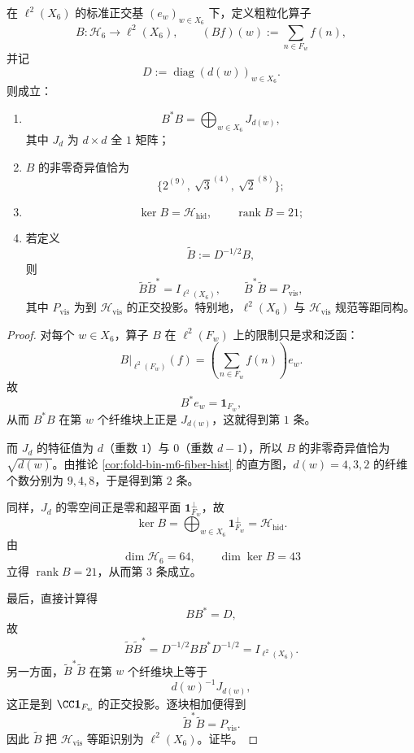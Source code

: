 \begin{theorem}[粗粒化算子的三值奇异谱]\label{thm:xi-time-part55d-window6-coarse-graining-three-singular-values}
在 \(\ell^2(X_6)\) 的标准正交基 \((e_w)_{w\in X_6}\) 下，定义粗粒化算子
\[
B:\mathcal H_6\longrightarrow \ell^2(X_6),
\qquad
(Bf)(w):=\sum_{n\in F_w}f(n),
\]
并记
\[
D:=\operatorname{diag}(d(w))_{w\in X_6}.
\]
则成立：
\begin{enumerate}
  \item
  \[
  B^*B=\bigoplus_{w\in X_6}J_{d(w)},
  \]
  其中 \(J_d\) 为 \(d\times d\) 全 \(1\) 矩阵；
  \item \(B\) 的非零奇异值恰为
  \[
  \{2^{(9)},\ \sqrt3^{(4)},\ \sqrt2^{(8)}\};
  \]
  \item
  \[
  \ker B=\mathcal H_{\mathrm{hid}},
  \qquad
  \operatorname{rank}B=21;
  \]
  \item 若定义
  \[
  \widetilde B:=D^{-1/2}B,
  \]
  则
  \[
  \widetilde B\widetilde B^*=I_{\ell^2(X_6)},
  \qquad
  \widetilde B^*\widetilde B=P_{\mathrm{vis}},
  \]
  其中 \(P_{\mathrm{vis}}\) 为到 \(\mathcal H_{\mathrm{vis}}\) 的正交投影。特别地，\(\ell^2(X_6)\) 与 \(\mathcal H_{\mathrm{vis}}\) 规范等距同构。
\end{enumerate}
\end{theorem}
\begin{proof}
对每个 \(w\in X_6\)，算子 \(B\) 在 \(\ell^2(F_w)\) 上的限制只是求和泛函：
\[
B|_{\ell^2(F_w)}(f)
=
\left(\sum_{n\in F_w}f(n)\right)e_w.
\]
故
\[
B^*e_w=\mathbf 1_{F_w},
\]
从而 \(B^*B\) 在第 \(w\) 个纤维块上正是 \(J_{d(w)}\)，这就得到第 \(1\) 条。

而 \(J_d\) 的特征值为 \(d\)（重数 \(1\)）与 \(0\)（重数 \(d-1\)），所以 \(B\) 的非零奇异值恰为 \(\sqrt{d(w)}\)。由推论 \ref{cor:fold-bin-m6-fiber-hist} 的直方图，\(d(w)=4,3,2\) 的纤维个数分别为 \(9,4,8\)，于是得到第 \(2\) 条。

同样，\(J_d\) 的零空间正是零和超平面 \(\mathbf 1_{F_w}^{\perp}\)，故
\[
\ker B
=
\bigoplus_{w\in X_6}\mathbf 1_{F_w}^{\perp}
=
\mathcal H_{\mathrm{hid}}.
\]
由
\[
\dim \mathcal H_6=64,
\qquad
\dim \ker B=43
\]
立得 \(\operatorname{rank}B=21\)，从而第 \(3\) 条成立。

最后，直接计算得
\[
BB^*=D,
\]
故
\[
\widetilde B\widetilde B^*
=
D^{-1/2}BB^*D^{-1/2}
=
I_{\ell^2(X_6)}.
\]
另一方面，\(\widetilde B^*\widetilde B\) 在第 \(w\) 个纤维块上等于
\[
d(w)^{-1}J_{d(w)},
\]
这正是到 \(\CC \mathbf 1_{F_w}\) 的正交投影。逐块相加便得到
\[
\widetilde B^*\widetilde B=P_{\mathrm{vis}}.
\]
因此 \(\widetilde B\) 把 \(\mathcal H_{\mathrm{vis}}\) 等距识别为 \(\ell^2(X_6)\)。证毕。
\end{proof}

